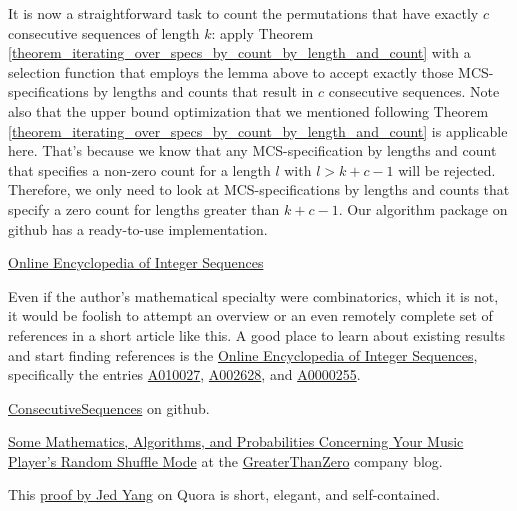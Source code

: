 \documentclass{article}
\begin{document}
It is now a straightforward task to count the permutations that have exactly $c$ consecutive sequences
of length $k$: apply Theorem \ref{theorem_iterating_over_specs_by_count_by_length_and_count} with a
selection function that employs the lemma above to accept exactly those MCS-specifications by lengths
and counts that result in $c$ consecutive sequences. Note also that the upper bound optimization that
we mentioned following Theorem \ref{theorem_iterating_over_specs_by_count_by_length_and_count} is
applicable here. That's because we know that any MCS-specification by lengths and count that specifies
a non-zero count for a length $l$ with $l > k + c - 1$ will be rejected. Therefore, we only need to
look at MCS-specifications by lengths and counts that specify a zero count for lengths greater than
$k + c - 1$. Our algorithm package on github \cite{Algos} has a ready-to-use implementation.


\begin{thebibliography}{0}

  \href{http://oeis.org/}{Online Encyclopedia of Integer Sequences}



  Even if the author's mathematical specialty were combinatorics, which it is not,
  it would be foolish to attempt an overview or an even remotely complete set of references
  in a short article like this. A good place to learn about existing results and start finding
  references is the \href{http://oeis.org/}{Online Encyclopedia of Integer Sequences}, specifically
 the entries \href{http://oeis.org/A010027}{A010027}, \href{http://oeis.org/A002628}{A002628}, and
  \href{http://oeis.org/A000255}{A0000255}.

    \href{https://github.com/walkswiththebear/ConsecutiveSequences}{ConsecutiveSequences} on github.

    \href{http://blog.greaterthanzero.com/post/159874910652/some-mathematics-algorithms-and-probabilities}{Some Mathematics, Algorithms, and Probabilities Concerning Your Music Player’s Random Shuffle Mode} at the \href{https://www.greaterthanzero.com}{GreaterThanZero} company blog. 

 This \href{https://www.quora.com/What-is-the-probability-that-a-shuffled-music-album-will-have-at-least-two-songs-in-their-original-relative-consecutive-order}{proof by Jed Yang}
  on Quora is short, elegant, and self-contained.
\end{thebibliography}
\end{document}
